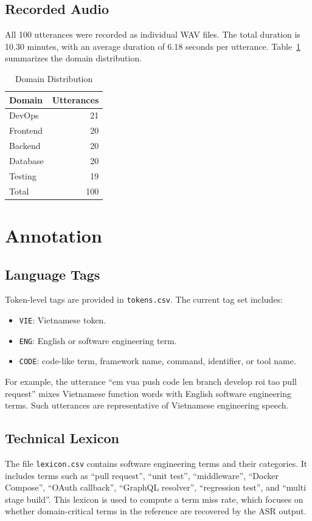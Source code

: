 \documentclass[conference]{IEEEtran}
\begin{document}
\subsection{Recorded Audio}
All 100 utterances were recorded as individual WAV files. The total duration is 10.30 minutes, with an average duration of 6.18 seconds per utterance. Table~\ref{tab:domains} summarizes the domain distribution.

\begin{table}[htbp]
\caption{Domain Distribution}
\begin{center}
\begin{tabular}{lr}
\toprule
\textbf{Domain} & \textbf{Utterances} \\
\midrule
DevOps & 21 \\
Frontend & 20 \\
Backend & 20 \\
Database & 20 \\
Testing & 19 \\
\midrule
Total & 100 \\
\bottomrule
\end{tabular}
\label{tab:domains}
\end{center}
\end{table}

\section{Annotation}
\subsection{Language Tags}
Token-level tags are provided in \texttt{tokens.csv}. The current tag set includes:
\begin{itemize}
\item \texttt{VIE}: Vietnamese token.
\item \texttt{ENG}: English or software engineering term.
\item \texttt{CODE}: code-like term, framework name, command, identifier, or tool name.
\end{itemize}

For example, the utterance ``em vua push code len branch develop roi tao pull request'' mixes Vietnamese function words with English software engineering terms. Such utterances are representative of Vietnamese engineering speech.

\subsection{Technical Lexicon}
The file \texttt{lexicon.csv} contains software engineering terms and their categories. It includes terms such as ``pull request'', ``unit test'', ``middleware'', ``Docker Compose'', ``OAuth callback'', ``GraphQL resolver'', ``regression test'', and ``multi stage build''. This lexicon is used to compute a term miss rate, which focuses on whether domain-critical terms in the reference are recovered by the ASR output.
\end{document}
